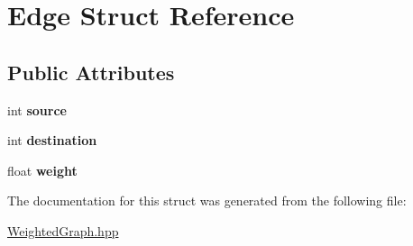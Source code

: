 \hypertarget{struct_edge}{\section{Edge Struct Reference}
\label{struct_edge}
}
\subsection*{Public Attributes}
\begin{DoxyCompactItemize}
\item 
\hypertarget{struct_edge_adcf410ae923d69e22ede2cd59ee80108}{int {\bfseries source}}\label{struct_edge_adcf410ae923d69e22ede2cd59ee80108}

\item 
\hypertarget{struct_edge_a2ad8a806f08daefd8bcaf0e8506e8425}{int {\bfseries destination}}\label{struct_edge_a2ad8a806f08daefd8bcaf0e8506e8425}

\item 
\hypertarget{struct_edge_ab158eed85f1b6514fcce44df783b39cc}{float {\bfseries weight}}\label{struct_edge_ab158eed85f1b6514fcce44df783b39cc}

\end{DoxyCompactItemize}


The documentation for this struct was generated from the following file\-:\begin{DoxyCompactItemize}
\item 
\hyperlink{_weighted_graph_8hpp}{Weighted\-Graph.\-hpp}\end{DoxyCompactItemize}
